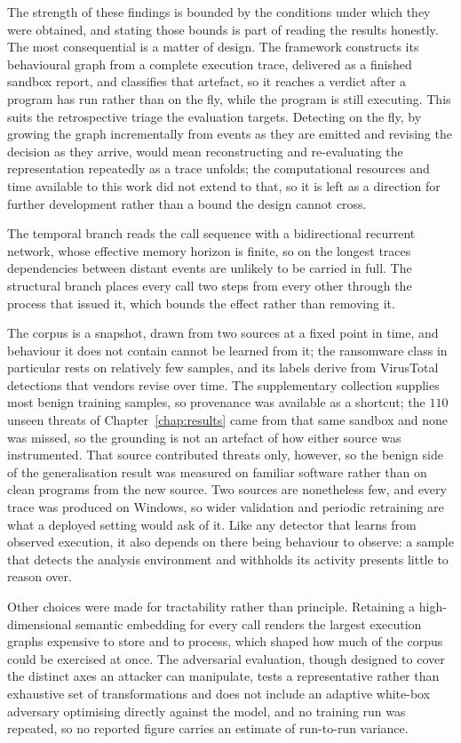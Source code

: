 \documentclass[%
    BCOR=10mm,
    DIV=13,
    toc=bibliography,
    toc=listof,
    oneside,
    12pt,
]{scrbook}
\begin{document}
The strength of these findings is bounded by the conditions under which they were
obtained, and stating those bounds is part of reading the results honestly. The
most consequential is a matter of design. The framework constructs its
behavioural graph from a complete execution trace, delivered as a finished
sandbox report, and classifies that artefact, so it reaches a verdict after a
program has run rather than on the fly, while the program is still executing.
This suits the retrospective triage the evaluation targets. Detecting on the fly,
by growing the graph incrementally from events as they are emitted and revising
the decision as they arrive, would mean reconstructing and re-evaluating the
representation repeatedly as a trace unfolds; the computational resources and
time available to this work did not extend to that, so it is left as a direction
for further development rather than a bound the design cannot cross.

The temporal branch reads the call sequence with a bidirectional recurrent
network, whose effective memory horizon is finite, so on the longest traces
dependencies between distant events are unlikely to be carried in full. The
structural branch places every call two steps from every other through the process
that issued it, which bounds the effect rather than removing it.

The corpus is a snapshot, drawn from two sources at a fixed point in time, and
behaviour it does not contain cannot be learned from it; the ransomware class
in particular rests on relatively few samples, and its labels derive from VirusTotal
detections that vendors revise over time. The supplementary
collection supplies most benign training samples, so provenance was available
as a shortcut; the $110$ unseen threats of Chapter~\ref{chap:results} came from
that same sandbox and none was missed, so the grounding is not an artefact of how
either source was instrumented. That source contributed threats only, however, so the
benign side of the generalisation result was measured on familiar software rather
than on clean programs from the new source. Two sources are nonetheless few,
and every trace was produced on Windows, so wider validation and periodic
retraining are what a deployed setting would ask of it. Like any detector that
learns from observed execution, it also depends on there being behaviour to
observe: a sample that detects the analysis environment and withholds its
activity presents little to reason over.

Other choices were made for tractability rather than principle. Retaining a
high-dimensional semantic embedding for every call renders the largest
execution graphs expensive to store and to process, which shaped how much of
the corpus could be exercised at once. The adversarial evaluation, though
designed to cover the distinct axes an attacker can manipulate, tests a
representative rather than exhaustive set of transformations and does not
include an adaptive white-box adversary optimising directly against the model,
and no training run was repeated, so no reported figure carries an estimate of
run-to-run variance.
\end{document}
